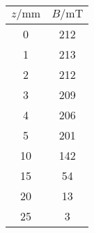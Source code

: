 \label{tab:magnetfeld2}
	\begin{tabular}{S[table-format=2.0]S[table-format=3.0]}
		\toprule
		{$z/\si{\milli\metre}$} & {$B/\si{\milli\tesla}$} \\
		 & 212 \\
		 1 & 213 \\
		 2 & 212 \\
		 3 & 209 \\
		 4 & 206 \\
		 5 & 201 \\
		10 & 142 \\
		15 &  54 \\
		20 &  13 \\
		25 &   3 \\
		\bottomrule
	\end{tabular}
